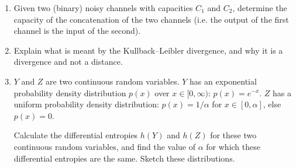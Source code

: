 \documentclass[11pt,a4paper]{article}
\begin{document}
\begin{enumerate}
\begin{enumerate}
    \item Given two (binary) noisy channels with capacities $C_1$ and $C_2$, determine the capacity of the concatenation of the two channels (i.e. the output of the first channel is the input of the second).

    \item Explain what is meant by the Kullback–Leibler divergence, and why it is a divergence and not a distance.

    \item $Y$ and $Z$ are two continuous random variables.  
    $Y$ has an exponential probability density distribution $p(x)$ over $x \in [0, \infty)$: $p(x) = e^{-x}$.  
    $Z$ has a uniform probability density distribution: $p(x) = 1/\alpha$ for $x \in [0, \alpha]$, else $p(x) = 0$.  

    Calculate the differential entropies $h(Y)$ and $h(Z)$ for these two continuous random variables, and find the value of $\alpha$ for which these differential entropies are the same.  
    Sketch these distributions.
\end{enumerate}

\end{enumerate}
\end{document}
